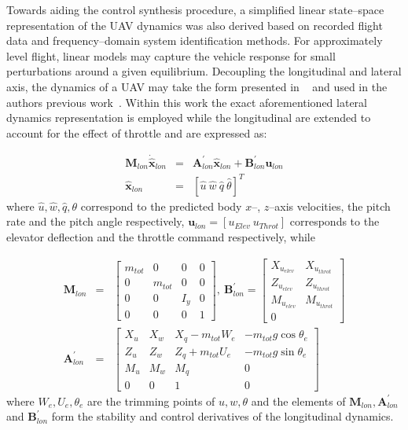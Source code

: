 
Towards aiding the control synthesis procedure, a simplified linear state--space representation of the UAV dynamics was also derived based on recorded flight data and frequency--domain system identification methods. For approximately level flight, linear models may capture the vehicle response for small perturbations around a given equilibrium. Decoupling the longitudinal and lateral axis, the dynamics of a UAV may take the form presented in ~\cite{dorobantu2011frequency} and used in the authors previous work~\cite{Oettershagen_MED14_L1MPC}. Within this work the exact aforementioned lateral dynamics representation is employed while the longitudinal are extended to account for the effect of throttle and are expressed as:

\small
\begin{eqnarray}\label{LON_DYN}
 \mathbf{M}_{lon}\dot{\mathbf{\hat{x}}}_{lon} &=& \mathbf{A}^\prime_{lon}\mathbf{\hat{x}}_{lon}+\mathbf{B}^\prime_{lon}\mathbf{u}_{lon} \\ \nonumber
 \mathbf{\hat{x}}_{lon} &=& \left[ \hat{u}~\hat{w}~\hat{q}~\hat{\theta} \right]^T
\end{eqnarray}
\normalsize
where $\hat{u},\hat{w},\hat{q},\theta$ correspond to the predicted body $x$--, $z$--axis velocities, the pitch rate and the pitch angle respectively, $\mathbf{u}_{lon} = [u_{Elev}~u_{Throt}]$ corresponds to the elevator deflection and the throttle command respectively, while

\footnotesize
\begin{eqnarray}
\mathbf{M}_{lon} &=& \begin{bmatrix}

m_{tot} & 0 & 0 & 0\\ 
0 & m_{tot} & 0 & 0\\ 
0 & 0 & I_y & 0\\ 
0 & 0 & 0 & 1
\end{bmatrix},~
\mathbf{B}^\prime_{lon} = \begin{bmatrix}
X_{u_{elev}} & X_{u_{throt}}\\ 
Z_{u_{elev}} & Z_{u_{throt}}\\ 
M_{u_{elev}} & M_{u_{throt}}\\ 
0
\end{bmatrix} \\ \nonumber
\mathbf{A}^\prime_{lon} &=& \begin{bmatrix}
X_u & X_w & X_q-m_{tot}W_e & -m_{tot}g\cos\theta_e\\ 
Z_u & Z_w & Z_q+m_{tot}U_e & -m_{tot}g\sin\theta_e\\ 
M_u & M_w & M_q & 0 \\ 
0 & 0 & 1 & 0
\end{bmatrix}
\end{eqnarray}
\normalsize
where $W_e,U_e,\theta_e$ are the trimming points of $u,w,\theta$ and the elements of $\mathbf{M}_{lon},\mathbf{A}^\prime_{lon}$ and $\mathbf{B}^\prime_{lon}$ form the stability and control derivatives of the longitudinal dynamics. 

